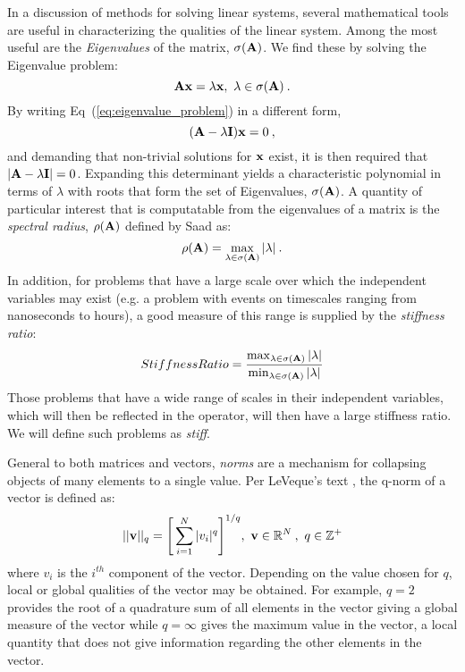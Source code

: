 In a discussion of methods for solving linear systems, several
mathematical tools are useful in characterizing the qualities of the
linear system. Among the most useful are the \textit{Eigenvalues} of
the matrix, $\sigma(\mathbf{A})$. We find these by solving the Eigenvalue
problem:
\begin{equation}
  \mathbf{A} \mathbf{x} = \lambda \mathbf{x},\ \lambda \in \sigma(\mathbf{A})\:.
  \label{eq:eigenvalue_problem}
\end{equation}
By writing Eq~(\ref{eq:eigenvalue_problem}) in a different form,
\begin{equation}
  (\mathbf{A} - \lambda \mathbf{I})\mathbf{x} = 0 \:,
  \label{eq:eigenvalue_problem_2}
\end{equation}
and demanding that non-trivial solutions for $\mathbf{x}$ exist, it is
then required that $|\mathbf{A} - \lambda \mathbf{I}| = 0$. Expanding this
determinant yields a characteristic polynomial in terms of $\lambda$
with roots that form the set of Eigenvalues, $\sigma(\mathbf{A})$. A
quantity of particular interest that is computatable from the
eigenvalues of a matrix is the \textit{spectral radius},
$\rho(\mathbf{A})$ defined by Saad \citep{saad_2003} as:
\begin{equation}
  \rho(\mathbf{A}) = \max_{\lambda \in \sigma(\mathbf{A})} |\lambda| \:.
  \label{eq:spectral_radius}
\end{equation}
In addition, for problems that have a large scale over which the
independent variables may exist (e.g. a problem with events on
timescales ranging from nanoseconds to hours), a good measure of this
range is supplied by the \textit{stiffness ratio}:
\begin{equation}
  Stiffness Ratio = \frac{\max_{\lambda \in \sigma(\mathbf{A})}
    |\lambda|}{\min_{\lambda \in \sigma(\mathbf{A})} |\lambda|}
\end{equation}
Those problems that have a wide range of scales in their independent
variables, which will then be reflected in the operator, will then
have a large stiffness ratio. We will define such problems as
\textit{stiff}.

General to both matrices and vectors, \textit{norms} are a mechanism
for collapsing objects of many elements to a single value. Per
LeVeque's text \citep{leveque_2007}, the q-norm of a vector is defined
as:
\begin{equation}
  ||\mathbf{v}||_q = \Bigg[ \sum_{i=1}^N |v_i|^q \Bigg]^{1/q},\ \mathbf{v} \in
  \mathbb{R}^N\:,\ q \in \mathbb{Z}^+
  \label{eq:q_norm}
\end{equation}
where ${v_i}$ is the $i^{th}$ component of the vector. Depending on
the value chosen for $q$, local or global qualities of the vector may
be obtained. For example, $q=2$ provides the root of a quadrature sum
of all elements in the vector giving a global measure of the vector
while $q=\infty$ gives the maximum value in the vector, a local
quantity that does not give information regarding the other elements
in the vector.

